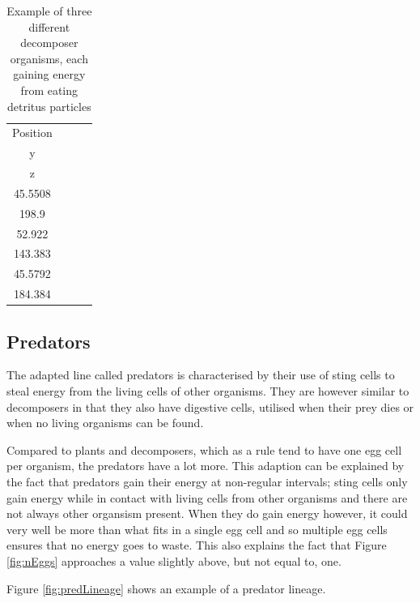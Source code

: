 \begin{table}[H]
\begin{tabular}{ c || c | c | c |}
     Position \(\left(\begin{array}{l} x\\y\\z\end{array}\right)\) & 
        \(\left(\begin{array}{l} 102.983\\45.5508\\198.9 \end{array}\right)\) &
        \(\left(\begin{array}{l} 107.391\\52.922\\143.383\end{array}\right)\) &
        \(\left(\begin{array}{l} 128.907\\45.5792\\184.384\end{array}\right)\)\\ \hline
 \end{tabular}
\caption{Example of three different decomposer organisms, each gaining energy from eating detritus particles}
\label{tab:3decomp}
\end{table}

\subsection{Predators}
The adapted line called predators is characterised by their use of sting cells to steal energy from the living cells of other organisms. They are however similar to decomposers in that they also have digestive cells, utilised when their prey dies or when no living organisms can be found.

Compared to plants and decomposers, which as a rule tend to have one egg cell per organism, the predators have a lot more. This adaption can be explained by the fact that predators gain their energy at non-regular intervals; sting cells only gain energy while in contact with living cells from other organisms and there are not always other organsism present. When they do gain energy however, it could very well be more than what fits in a single egg cell and so multiple egg cells ensures that no energy goes to waste. This also explains the fact that Figure \ref{fig:nEggs} approaches a value slightly above, but not equal to, one.

Figure \ref{fig:predLineage} shows an example of a predator lineage.

